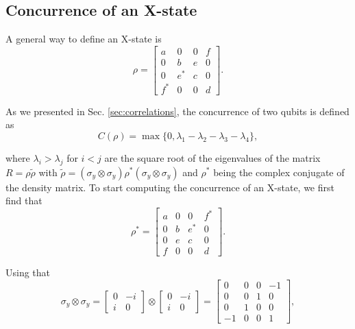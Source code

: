 
\begin{apendicesenv}

\chapter{Concurrence of an X-state}
\label{apx:concurrence}

A general way to define an X-state is
\begin{equation}
    \rho = 
    \begin{bmatrix}
        a & 0 & 0 & f\\
        0 & b & e & 0\\
        0 & e^* & c & 0\\
        f^* & 0 & 0 & d
    \end{bmatrix}.
\end{equation}

\noindent As we presented in Sec. \ref{sec:correlations}, the concurrence of two qubits is defined as
\begin{equation}
    C({\rho}) = \max\{ 0, \lambda_1 - \lambda_2 - \lambda_3 - \lambda_4 \},
\end{equation}

\noindent where $\lambda_i > \lambda_j$ for $i<j$ are the square root of the eigenvalues of the matrix $R = \rho \tilde{\rho}$ with $\tilde{\rho} = (\sigma_y \otimes \sigma_y) \rho^* (\sigma_y \otimes \sigma_y)$ and $\rho^*$ being the complex conjugate of the density matrix. To start computing the concurrence of an X-state, we first find that
\begin{equation}
    \rho^* = 
    \begin{bmatrix}
        a & 0 & 0 & f^*\\
        0 & b & e^* & 0\\
        0 & e & c & 0\\
        f & 0 & 0 & d
    \end{bmatrix}.
\end{equation}

\noindent Using that
\begin{equation}
    \sigma_y \otimes \sigma_y = 
    \begin{bmatrix}
        0 & -i\\
        i & 0
    \end{bmatrix} \otimes
    \begin{bmatrix}
        0 & -i\\
        i & 0
    \end{bmatrix} =
    \begin{bmatrix}
        0 & 0 & 0 & -1\\
        0 & 0 & 1 & 0\\
        0 & 1 & 0 & 0\\
        -1 & 0 & 0 & 1
    \end{bmatrix},
\end{equation}


\end{apendicesenv}
